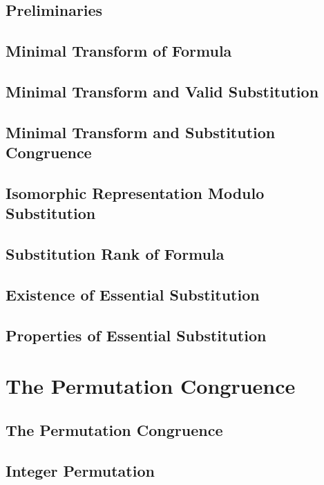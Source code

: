 \documentclass{report}
\begin{document}
    \subsection{Preliminaries}
      
    \subsection{Minimal Transform of Formula}
      
    \subsection{Minimal Transform and Valid Substitution}
      
    \subsection{Minimal Transform and Substitution Congruence}
      
    \subsection{Isomorphic Representation Modulo Substitution}
      
    \subsection{Substitution Rank of Formula}
      
    \subsection{Existence of Essential Substitution}
      
    \subsection{Properties of Essential Substitution}
      
\section{The Permutation Congruence}
    \subsection{The Permutation Congruence}
      
    \subsection{Integer Permutation}
      
\end{document}
